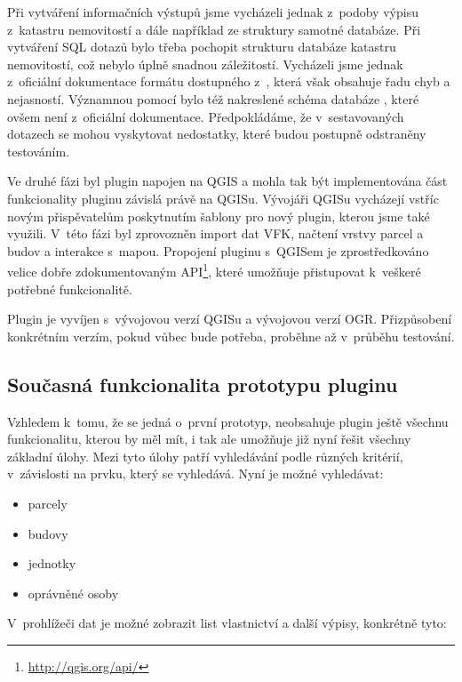\documentclass[a4paper,12pt]{article}
\begin{document}
Při vytváření informačních výstupů jsme vycházeli jednak z~podoby výpisu z~katastru nemovitostí a dále například ze struktury samotné databáze.
Při vytváření SQL dotazů bylo třeba pochopit strukturu databáze katastru nemovitostí, což nebylo úplně snadnou záležitostí.
Vycházeli jsme jednak z~oficiální dokumentace formátu dostupného z~\cite{VFKDokumentace},
která však obsahuje řadu  chyb a nejasností.
Významnou pomocí bylo též nakreslené schéma databáze \cite{MartinThesis}, které ovšem není z~oficiální dokumentace.
Předpokládáme, že v~sestavovaných dotazech se mohou vyskytovat nedostatky, které budou postupně odstraněny testováním.

Ve druhé fázi byl plugin napojen na QGIS a mohla tak být implementována část funkcionality pluginu závislá právě na QGISu.
Vývojáři QGISu vycházejí vstříc novým přispěvatelům poskytnutím šablony pro nový plugin, kterou jsme také využili.
V~této fázi byl zprovozněn import dat VFK, načtení vrstvy parcel a budov a interakce s~mapou.
Propojení pluginu s~QGISem je zprostředkováno velice dobře zdokumentovaným API\footnote{\url{http://qgis.org/api/}},
které umožňuje přistupovat k~veškeré potřebné funkcionalitě.

Plugin je vyvíjen s~vývojovou verzí QGISu a vývojovou verzí OGR.
Přizpůsobení konkrétním verzím, pokud vůbec bude potřeba, proběhne až v~průběhu testování.

\subsection{Současná funkcionalita prototypu pluginu}
Vzhledem k~tomu, že se jedná o~první prototyp, neobsahuje plugin ještě všechnu funkcionalitu, kterou by měl mít,
i tak ale umožňuje již nyní řešit všechny základní úlohy.
Mezi tyto úlohy patří vyhledávání podle různých kritérií, v~závislosti na prvku, který se vyhledává.
Nyní je možné vyhledávat:
\begin{itemize}
    \item parcely
    \item budovy
    \item jednotky
    \item oprávněné osoby
\end{itemize}
V~prohlížeči dat je možné zobrazit list vlastnictví a další výpisy, konkrétně tyto:
    
\end{document}
